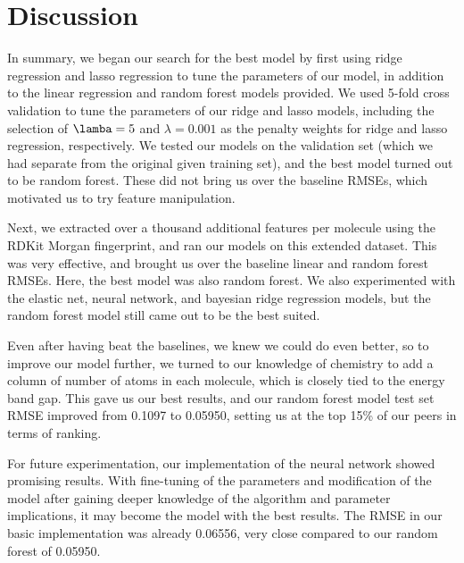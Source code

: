 \documentclass[11pt]{article}
\begin{document}
\section{Discussion} 

    In summary, we began our search for the best model by first using ridge regression and lasso regression to tune the parameters of our model, in addition to the linear regression and random forest models provided. We used 5-fold cross validation to tune the parameters of our ridge and lasso models, including the selection of $\lamba = 5$ and $\lambda = 0.001$ as the penalty weights for ridge and lasso regression, respectively. We tested our models on the validation set (which we had separate from the original given training set), and the best model turned out to be random forest. These did not bring us over the baseline RMSEs, which motivated us to try feature manipulation.
    
    Next, we extracted over a thousand additional features per molecule using the RDKit Morgan fingerprint, and ran our models on this extended dataset. This was very effective, and brought us over the baseline linear and random forest RMSEs. Here, the best model was also random forest. We also experimented with the elastic net, neural network, and bayesian ridge regression models, but the random forest model still came out to be the best suited.
    
    Even after having beat the baselines, we knew we could do even better, so to improve our model further, we turned to our knowledge of chemistry to add a column of number of atoms in each molecule, which is closely tied to the energy band gap. This gave us our best results, and our random forest model test set RMSE improved from 0.1097 to 0.05950, setting us at the top 15\% of our peers in terms of ranking.
    
    For future experimentation, our implementation of the neural network showed promising results. With fine-tuning of the parameters and modification of the model after gaining deeper knowledge of the algorithm and parameter implications, it may become the model with the best results. The RMSE in our basic implementation was already 0.06556, very close compared to our random forest of 0.05950.
\end{document}
